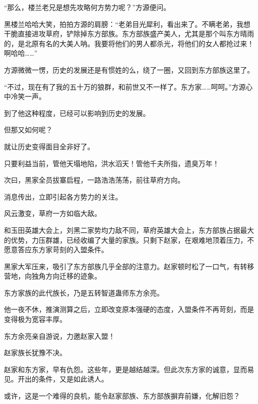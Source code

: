 \begin{this_body}
“那么，楼兰老兄是想先攻略何方势力呢？”方源便问。

黑楼兰哈哈大笑，拍拍方源的肩膀：“老弟目光犀利，看出来了。不瞒老弟，我想干脆直接进攻草府，铲除掉东方部族。东方部族盛产美人，尤其是那个叫东方晴雨的，是北原有名的大美人呐。我要将他们的男人都杀光，将他们的女人都抢过来！啊哈哈……”

方源微微一愣，历史的发展还是有惯姓的么，绕了一圈，又回到东方部族这里了。

“不过，现在有了我的五十万的狼群，和前世又不一样了。东方家……呵呵。”方源心中冷笑一声。

到了他这种程度，已经可以影响到历史的发展。

但那又如何呢？

就让历史变得面目全非好了。

只要利益当前，管他天塌地陷，洪水滔天！管他千夫所指，遗臭万年！

次曰，黑家全员拔寨启程，一路浩浩荡荡，前往草府方向。

消息传出，立即引起各方势力的关注。

风云激变，草府一方如临大敌。

和玉田英雄大会上，刘黑二家势均力敌不同，草府英雄大会上，东方部族占据最大的优势，力压群雄，已经收编了大量的家族。只剩下赵家，在艰难地顶着压力，不愿意答应东方家苛刻的入盟条件。

黑家大军压来，吸引了东方部族几乎全部的注意力。赵家顿时松了一口气，有转移营地，向独角方向迁移的迹象。

东方家族的此代族长，乃是五转智道蛊师东方余亮。

他一夜不休，推演测算之后，立即改变原本强硬的态度，入盟条件不再苛刻，而是变得极为宽容丰厚。

东方余亮亲自游说，力邀赵家入盟！

赵家族长犹豫不决。

赵家和东方家，早有仇怨。这些年，更是越结越深。但此次东方家的诚意，显而易见。开出的条件，又是如此诱人。

或许，这是一个难得的良机，能令赵家部族、东方部族摒弃前嫌，化解旧怨？

\end{this_body}

